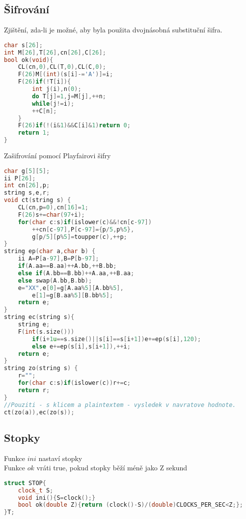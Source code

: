 \documentclass[11pt]{article}
\begin{document}
\subsection{Šifrování}
Zjištění, zda-li je možné, aby byla použita dvojnásobná substituční šifra.
\begin{lstlisting}[language=C++]
char s[26];
int M[26],T[26],cn[26],C[26];
bool ok(void){
    CL(cn,0),CL(T,0),CL(C,0);
	F(26)M[(int)(s[i]-='A')]=i;    
    F(26)if(!T[i]){
 	    int j(i),n(0);
     	do T[j]=1,j=M[j],++n;
	    while(j!=i);
	    ++C[n];
    }
    F(26)if(!(i&1)&&C[i]&1)return 0;
    return 1;
}
\end{lstlisting}
Zašifrování pomocí Playfairovi šifry
\begin{lstlisting}[language=C++]
char g[5][5];
ii P[26];
int cn[26],p;
string s,e,r;
void ct(string s) {
    CL(cn,p=0),cn[16]=1;
    F(26)s+=char(97+i);
    for(char c:s)if(islower(c)&&!cn[c-97])
        ++cn[c-97],P[c-97]={p/5,p%5},
        g[p/5][p%5]=toupper(c),++p;
}
string ep(char a,char b) {
    ii A=P[a-97],B=P[b-97];
    if(A.aa==B.aa)++A.bb,++B.bb;
    else if(A.bb==B.bb)++A.aa,++B.aa;
    else swap(A.bb,B.bb);
    e="XX",e[0]=g[A.aa%5][A.bb%5],
        e[1]=g[B.aa%5][B.bb%5];
    return e;
}
string ec(string s){
    string e;
    F(int(s.size()))
        if(i+1u==s.size()||s[i]==s[i+1])e+=ep(s[i],120);
        else e+=ep(s[i],s[i+1]),++i;
    return e;
}
string zo(string s) {
    r="";
    for(char c:s)if(islower(c))r+=c;
    return r;
}
//Pouziti - s klicem a plaintextem - vysledek v navratove hodnote.
ct(zo(a)),ec(zo(s));
\end{lstlisting}
\subsection{Stopky}
Funkce $ini$ nastaví stopky
\\Funkce $ok$ vráti true, pokud stopky běží méně jako \textsf{Z} sekund
\begin{lstlisting}[language=C++]
struct STOP{
    clock_t S;
    void ini(){S=clock();}
    bool ok(double Z){return (clock()-S)/(double)CLOCKS_PER_SEC<Z;};
}T;
\end{lstlisting}
\end{document}
